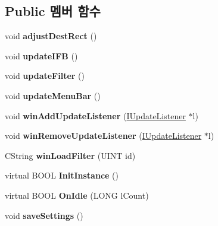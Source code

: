\subsection*{Public 멤버 함수}
\begin{DoxyCompactItemize}
\item 
\mbox{\label{class_v_b_a_acb822065cba8b15810c5a61fd05ca831}} 
void {\bfseries adjust\+Dest\+Rect} ()
\item 
\mbox{\label{class_v_b_a_ab1caa25635cd40fc3b49b5d325cc65ef}} 
void {\bfseries update\+I\+FB} ()
\item 
\mbox{\label{class_v_b_a_afbe0e6f9458f25adb848516537a91747}} 
void {\bfseries update\+Filter} ()
\item 
\mbox{\label{class_v_b_a_accf3451bad473b90400193636cd27c96}} 
void {\bfseries update\+Menu\+Bar} ()
\item 
\mbox{\label{class_v_b_a_af0712f70a90d023ab8327a366be08174}} 
void {\bfseries win\+Add\+Update\+Listener} (\mbox{\hyperlink{class_i_update_listener}{I\+Update\+Listener}} $\ast$l)
\item 
\mbox{\label{class_v_b_a_a2d31a0656df2230310aa8dc9e3a735d3}} 
void {\bfseries win\+Remove\+Update\+Listener} (\mbox{\hyperlink{class_i_update_listener}{I\+Update\+Listener}} $\ast$l)
\item 
\mbox{\label{class_v_b_a_a228edf26b0dc4129658c174ee5a3c27c}} 
C\+String {\bfseries win\+Load\+Filter} (U\+I\+NT id)
\item 
\mbox{\label{class_v_b_a_a35c73ff552824e3eba6e90393a4692d4}} 
virtual B\+O\+OL {\bfseries Init\+Instance} ()
\item 
\mbox{\label{class_v_b_a_a0296d1fa6a340dffd47dbe623b64475c}} 
virtual B\+O\+OL {\bfseries On\+Idle} (L\+O\+NG l\+Count)
\item 
\mbox{\label{class_v_b_a_aa09989acc3edb3991dc98a88655dabdb}} 
void {\bfseries save\+Settings} ()
\item 
\mbox{\label{class_v_b_a_a0f0d982604ac77d23e7fd474c4ebbe2c}} 

\end{DoxyCompactItemize}

